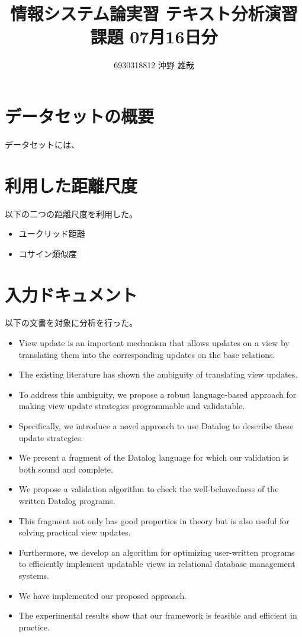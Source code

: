 \documentclass{jsarticle}
\begin{document}
\title{情報システム論実習 テキスト分析演習課題 07月16日分}
\author{6930318812 沖野 雄哉}
\maketitle

\section{データセットの概要}
データセットには、

\section{利用した距離尺度}
以下の二つの距離尺度を利用した。
\begin{itemize}
  \item ユークリッド距離
  \item コサイン類似度
\end{itemize}

\section{入力ドキュメント}
以下の文書を対象に分析を行った。

\begin{itemize}
  \item View update is an important mechanism that allows updates on a view by translating them into the corresponding updates on the base relations.
  \item The existing literature has shown the ambiguity of translating view updates.
  \item To address this ambiguity, we propose a robust language-based approach for making view update strategies programmable and validatable.
  \item Specifically, we introduce a novel approach to use Datalog to describe these update strategies.
  \item We present a fragment of the Datalog language for which our validation is both sound and complete.
  \item We propose a validation algorithm to check the well-behavedness of the written Datalog programs.
  \item This fragment not only has good properties in theory but is also useful for solving practical view updates.
  \item Furthermore, we develop an algorithm for optimizing user-written programs to efficiently implement updatable views in relational database management systems.
  \item We have implemented our proposed approach.
  \item The experimental results show that our framework is feasible and efficient in practice.
\end{itemize}
\end{document}
